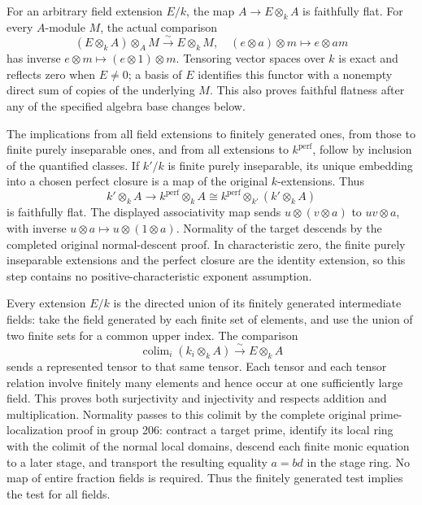 For an arbitrary field extension \(E/k\), the map \(A\to E\otimes_kA\) is faithfully flat. For every \(A\)-module \(M\), the actual comparison \[
 (E\otimes_kA)\otimes_AM\xrightarrow{\sim}E\otimes_kM,
 \quad (e\otimes a)\otimes m\longmapsto e\otimes am
\] has inverse \(e\otimes m\mapsto(e\otimes1)\otimes m\). Tensoring vector spaces over \(k\) is exact and reflects zero when \(E\ne0\); a basis of \(E\) identifies this functor with a nonempty direct sum of copies of the underlying \(M\). This also proves faithful flatness after any of the specified algebra base changes below.

The implications from all field extensions to finitely generated ones, from those to finite purely inseparable ones, and from all extensions to \(k^{\mathrm{perf}}\), follow by inclusion of the quantified classes. If \(k'/k\) is finite purely inseparable, its unique embedding into a chosen perfect closure is a map of the original \(k\)-extensions. Thus \[
 k'\otimes_kA\longrightarrow k^{\mathrm{perf}}\otimes_kA
 \cong k^{\mathrm{perf}}\otimes_{k'}(k'\otimes_kA)
\] is faithfully flat. The displayed associativity map sends \(u\otimes(v\otimes a)\) to \(uv\otimes a\), with inverse \(u\otimes a\mapsto u\otimes(1\otimes a)\). Normality of the target descends by the completed original normal-descent proof. In characteristic zero, the finite purely inseparable extensions and the perfect closure are the identity extension, so this step contains no positive-characteristic exponent assumption.

Every extension \(E/k\) is the directed union of its finitely generated intermediate fields: take the field generated by each finite set of elements, and use the union of two finite sets for a common upper index. The comparison \[
 \operatorname{colim}_i(k_i\otimes_kA)\xrightarrow{\sim}E\otimes_kA
\] sends a represented tensor to that same tensor. Each tensor and each tensor relation involve finitely many elements and hence occur at one sufficiently large field. This proves both surjectivity and injectivity and respects addition and multiplication. Normality passes to this colimit by the complete original prime-localization proof in group 206: contract a target prime, identify its local ring with the colimit of the normal local domains, descend each finite monic equation to a later stage, and transport the resulting equality \(a=bd\) in the stage ring. No map of entire fraction fields is required. Thus the finitely generated test implies the test for all fields.


